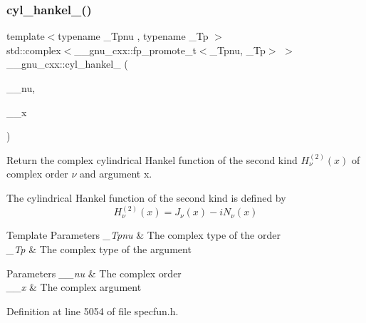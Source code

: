 \subsubsection{\texorpdfstring{cyl\+\_\+hankel\+\_()}{cyl\_hankel\_2()}\hspace{0.1cm}{\footnotesize\ttfamily [2/2]}}
{\footnotesize\ttfamily template$<$typename \+\_\+\+Tpnu , typename \+\_\+\+Tp $>$ \\
std\+::complex$<$\+\_\+\+\_\+gnu\+\_\+cxx\+::fp\+\_\+promote\+\_\+t$<$\+\_\+\+Tpnu, \+\_\+\+Tp$>$ $>$ \+\_\+\+\_\+gnu\+\_\+cxx\+::cyl\+\_\+hankel\+\_ (\begin{DoxyParamCaption}\item[{std\+::complex$<$ \+\_\+\+Tpnu $>$}]{\+\_\+\+\_\+nu,  }\item[{std\+::complex$<$ \+\_\+\+Tp $>$}]{\+\_\+\+\_\+x }\end{DoxyParamCaption})\hspace{0.3cm}{\ttfamily [inline]}}

Return the complex cylindrical Hankel function of the second kind $ H^{(2)}_\nu(x) $ of complex order $ \nu $ and argument {\ttfamily x}.

The cylindrical Hankel function of the second kind is defined by \[ H^{(2)}_\nu(x) = J_\nu(x) - i N_\nu(x) \]


\begin{DoxyTemplParams}{Template Parameters}
{\em \+\_\+\+Tpnu} & The complex type of the order \\
\hline
{\em \+\_\+\+Tp} & The complex type of the argument \\
\hline
\end{DoxyTemplParams}

\begin{DoxyParams}{Parameters}
{\em \+\_\+\+\_\+nu} & The complex order \\
\hline
{\em \+\_\+\+\_\+x} & The complex argument \\
\hline
\end{DoxyParams}


Definition at line 5054 of file specfun.\+h.

\mbox{\label{group__mathsf__gnu_ga2b75361870975c47d57bed71b4064ce7}} 
